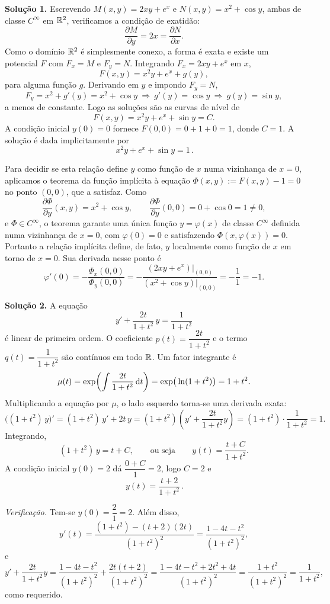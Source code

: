 \bigskip\noindent\textbf{Solução 1.}\quad
Escrevendo $M(x,y)=2xy+e^x$ e $N(x,y)=x^2+\cos y$, ambas de classe $C^\infty$ em $\mathbb{R}^2$, verificamos a condição de exatidão:
\[
\frac{\partial M}{\partial y}=2x=\frac{\partial N}{\partial x}.
\]
Como o domínio $\mathbb{R}^2$ é simplesmente conexo, a forma é exata e existe um potencial $F$ com $F_x=M$ e $F_y=N$. Integrando $F_x=2xy+e^x$ em $x$,
\[
F(x,y)=x^2y+e^x+g(y),
\]
para alguma função $g$. Derivando em $y$ e impondo $F_y=N$,
\[
F_y=x^2+g'(y)=x^2+\cos y\ \Longrightarrow\ g'(y)=\cos y\ \Longrightarrow\ g(y)=\sin y,
\]
a menos de constante. Logo as soluções são as curvas de nível de
\[
F(x,y)=x^2y+e^x+\sin y=C.
\]
A condição inicial $y(0)=0$ fornece $F(0,0)=0+1+0=1$, donde $C=1$. A solução é dada implicitamente por
\[
\boxed{\,x^2y+e^x+\sin y=1\,}.
\]

Para decidir se esta relação define $y$ como função de $x$ numa vizinhança de $x=0$, aplicamos o teorema da função implícita à equação $\Phi(x,y):=F(x,y)-1=0$ no ponto $(0,0)$, que a satisfaz. Como
\[
\frac{\partial \Phi}{\partial y}(x,y)=x^2+\cos y,
\qquad
\frac{\partial \Phi}{\partial y}(0,0)=0+\cos 0=1\neq 0,
\]
e $\Phi\in C^\infty$, o teorema garante uma única função $y=\varphi(x)$ de classe $C^\infty$ definida numa vizinhança de $x=0$, com $\varphi(0)=0$ e satisfazendo $\Phi(x,\varphi(x))=0$. Portanto a relação implícita define, de fato, $y$ localmente como função de $x$ em torno de $x=0$. Sua derivada nesse ponto é
\[
\varphi'(0)=-\frac{\Phi_x(0,0)}{\Phi_y(0,0)}=-\frac{(2xy+e^x)\big|_{(0,0)}}{(x^2+\cos y)\big|_{(0,0)}}=-\frac{1}{1}=-1.
\]

\bigskip\noindent\textbf{Solução 2.}\quad
A equação
\[
y'+\frac{2t}{1+t^2}\,y=\frac{1}{1+t^2}
\]
é linear de primeira ordem. O coeficiente $p(t)=\dfrac{2t}{1+t^2}$ e o termo $q(t)=\dfrac{1}{1+t^2}$ são contínuos em todo $\mathbb{R}$. Um fator integrante é
\[
\mu(t)=\exp\!\left(\int \frac{2t}{1+t^2}\,\mathrm{d} t\right)=\exp\!\big(\ln(1+t^2)\big)=1+t^2.
\]
Multiplicando a equação por $\mu$, o lado esquerdo torna-se uma derivada exata:
\[
\big((1+t^2)\,y\big)'=(1+t^2)\,y'+2t\,y=(1+t^2)\!\left(y'+\frac{2t}{1+t^2}y\right)=(1+t^2)\cdot\frac{1}{1+t^2}=1.
\]
Integrando,
\[
(1+t^2)\,y=t+C,\qquad\text{ou seja}\qquad y(t)=\frac{t+C}{1+t^2}.
\]
A condição inicial $y(0)=2$ dá $\dfrac{0+C}{1}=2$, logo $C=2$ e
\[
\boxed{\,y(t)=\dfrac{t+2}{1+t^2}\,}.
\]

\emph{Verificação.} Tem-se $y(0)=\dfrac{2}{1}=2$. Além disso,
\[
y'(t)=\frac{(1+t^2)-(t+2)(2t)}{(1+t^2)^2}=\frac{1-4t-t^2}{(1+t^2)^2},
\]
e
\[
y'+\frac{2t}{1+t^2}y=\frac{1-4t-t^2}{(1+t^2)^2}+\frac{2t(t+2)}{(1+t^2)^2}=\frac{1-4t-t^2+2t^2+4t}{(1+t^2)^2}=\frac{1+t^2}{(1+t^2)^2}=\frac{1}{1+t^2},
\]
como requerido.

